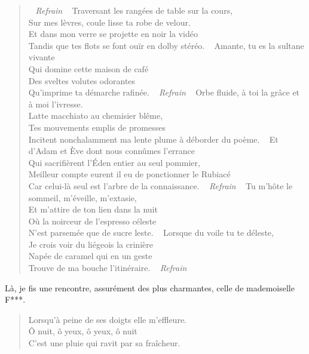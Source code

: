 \begin{verse}
~
\emph{Refrain}
~
Traversant les rangées de table sur la cours,\\
Sur mes lèvres, coule lisse ta robe de velour.\\
Et dans mon verre se projette en noir la vidéo\\
Tandis que tes flots se font ouïr en dolby stéréo.
~
Amante, tu es la sultane vivante\\
Qui domine cette maison de café\\
Des sveltes volutes odorantes\\
Qu’imprime ta démarche rafinée.
~
\emph{Refrain}
~
Orbe fluide, à toi la grâce et à moi l’ivresse.\\
Latte macchiato au chemisier blême,\\
Tes mouvements emplis de promesses\\
Incitent nonchalamment ma lente plume à déborder du poème.
~
Et d’Adam et Ève dont nous connûmes l’errance\\
Qui sacrifièrent l’Éden entier au seul pommier,\\
Meilleur compte eurent il eu de ponctionner le Rubiacé\\
Car celui-là seul est l’arbre de la connaissance.
~
\emph{Refrain}
~
Tu m’hôte le sommeil, m’éveille, m’extasie,\\
Et m’attire de ton lien dans la nuit\\
Où la noirceur de l’espresso céleste\\
N’est parsemée que de sucre leste.
~
Lorsque du voile tu te déleste,\\
Je crois voir du liégeois la crinière\\
Napée de caramel qui en un geste\\
Trouve de ma bouche l’itinéraire.
~
\emph{Refrain}
\end{verse}

\begin{prose}
Là, je fis une rencontre, assurément des plus charmantes, celle de mademoiselle F***.
\end{prose}

\begin{verse}
Lorsqu’à peine de ses doigts elle m’effleure.\\
Ô nuit, ô yeux, ô yeux, ô nuit\\
C’est une pluie qui ravit par sa fraîcheur.
\end{verse}

